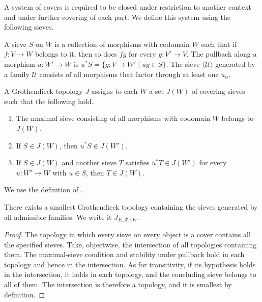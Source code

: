 \begin{definition}
A system of covers is required to be closed under restriction to another context
and under further covering of each part.
We define this system using the following sieves.

\end{definition}

\begin{definition}\label{def:1.20}

A sieve $S$ on $W$ is a collection of morphisms with codomain $W$ such that if
$f:V\to W$ belongs to it, then so does $fg$ for every $g:V'\to V$.
The pullback along a morphism $u:W'\to W$ is
$u^*S=\{g:V\to W'\mid ug\in S\}$.
The sieve $\langle \mathcal{U}\rangle$ generated by a family $\mathcal{U}$
consists of all morphisms that factor through at least one $u_\alpha$.

A Grothendieck topology $J$ assigns to each $W$ a set $J(W)$ of covering sieves
such that the following hold.

\begin{enumerate}
\item The maximal sieve consisting of all morphisms with codomain $W$ belongs
to $J(W)$.
\item If $S\in J(W)$, then $u^*S\in J(W')$.
\item If $S\in J(W)$ and another sieve $T$ satisfies $u^*T\in J(W')$ for every
$u:W'\to W$ with $u\in S$, then $T\in J(W)$.
\end{enumerate}

We use the definition of
\cite[\href{https://stacks.math.columbia.edu/tag/00YW}{\S7.47, Tag 00YW}]{Stacks}.

\end{definition}

\begin{proposition}\label{prop:1.21}

There exists a smallest Grothendieck topology containing the sieves generated by
all admissible families.
We write it $J_{E,\mathcal{R},\mathrm{Ov}}$.

\end{proposition}

\begin{proof}

The topology in which every sieve on every object is a cover contains all the
specified sieves.
Take, objectwise, the intersection of all topologies containing them.
The maximal-sieve condition and stability under pullback hold in each topology
and hence in the intersection.
As for transitivity, if its hypothesis holds in the intersection, it holds in
each topology, and the concluding sieve belongs to all of them.
The intersection is therefore a topology, and it is smallest by definition.

\end{proof}

